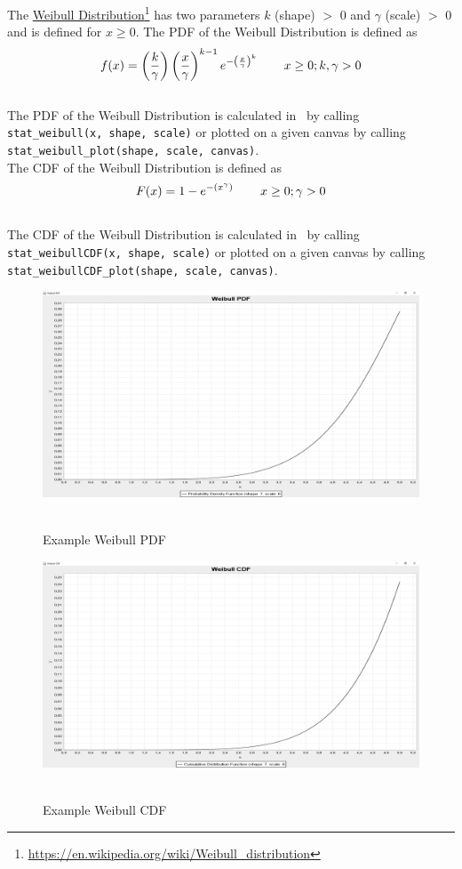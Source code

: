 		The \href{https://en.wikipedia.org/wiki/Weibull_distribution}{Weibull Distribution}\footnote{\url{https://en.wikipedia.org/wiki/Weibull_distribution}} has two parameters $k$ (shape) $>$ 0 and $\gamma$ (scale) $>$ 0 and is defined for $x \geq 0$. The \ac{PDF} of the Weibull Distribution is defined as
		\\[0.3cm]
		$$f(x) = \left(\frac{k}{\gamma}\right)\left(\frac{x}{\gamma}\right)^{k-1}e^{-\left(\frac{x}{\gamma}\right)^{k}} \hspace{.3in} x \geq 0; k,\gamma > 0\\$$
		\\[0.3cm]
		The \ac{PDF} of the Weibull Distribution is calculated in \setlx\ by calling \lstinline{stat_weibull(x, shape, scale)} or plotted on a given canvas by calling \lstinline{stat_weibull_plot(shape, scale, canvas)}.
		\\[0.3cm]
		The \ac{CDF} of the Weibull Distribution is defined as
		\\[0.3cm]
		$$F(x) = 1 - e^{-(x^{\gamma})} \hspace{.3in} x \geq 0; \gamma > 0$$
		\\[0.3cm]
		The \ac{CDF} of the Weibull Distribution is calculated in \setlx\ by calling \lstinline{stat_weibullCDF(x, shape, scale)} or plotted on a given canvas by calling \lstinline{stat_weibullCDF_plot(shape, scale, canvas)}.
		
		\begin{figure}[H]
			\centering
			\includegraphics[width=1\textwidth]{Figures/implemented_functions/weibull_pdf}~\\
			\caption{Example Weibull PDF}
			\label{fig:weibull_pdf}
		\end{figure}


		\begin{figure}[H]
			\centering
			\includegraphics[width=1\textwidth]{Figures/implemented_functions/weibull_cdf}~\\
			\caption{Example Weibull CDF}
			\label{fig:weibull_cdf}
		\end{figure}
